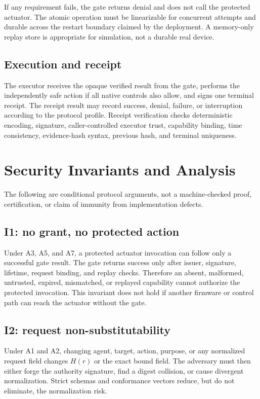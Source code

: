 \documentclass[10.5pt,a4paper]{article}
\begin{document}
If any requirement fails, the gate returns denial and does not call the protected actuator.
The atomic operation must be linearizable for concurrent attempts and durable across the restart
boundary claimed by the deployment. A memory-only replay store is appropriate for simulation,
not a durable real device.

\subsection{Execution and receipt}

The executor receives the opaque verified result from the gate, performs the independently safe
action if all native controls also allow, and signs one terminal receipt. The receipt result may
record success, denial, failure, or interruption according to the protocol profile. Receipt
verification checks deterministic encoding, signature, caller-controlled executor trust,
capability binding, time consistency, evidence-hash syntax, previous hash, and terminal
uniqueness.

\section{Security Invariants and Analysis}\label{sec:analysis}

The following are conditional protocol arguments, not a machine-checked proof, certification,
or claim of immunity from implementation defects.

\subsection{I1: no grant, no protected action}

Under A3, A5, and A7, a protected actuator invocation can follow only a successful gate result.
The gate returns success only after issuer, signature, lifetime, request binding, and replay
checks. Therefore an absent, malformed, untrusted, expired, mismatched, or replayed capability
cannot authorize the protected invocation. This invariant does not hold if another firmware or
control path can reach the actuator without the gate.

\subsection{I2: request non-substitutability}

Under A1 and A2, changing agent, target, action, purpose, or any normalized request field changes
$H(r)$ or the exact bound field. The adversary must then either forge the authority signature,
find a digest collision, or cause divergent normalization. Strict schemas and conformance vectors
reduce, but do not eliminate, the normalization risk.
\end{document}
